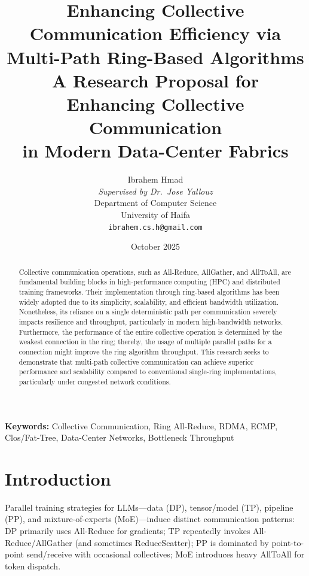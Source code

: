 \documentclass[12pt]{article}
\title{\textbf{Enhancing Collective Communication Efficiency via Multi-Path Ring-Based Algorithms}\\[0.5em]
       \large A Research Proposal for Enhancing Collective Communication\\
       in Modern Data-Center Fabrics}
\author{Ibrahem Hmad\\[0.5em]
        \textit{Supervised by Dr.\ Jose Yallouz}\\[0.3em]
        Department of Computer Science\\
        University of Haifa\\[0.5em]
        \texttt{ibrahem.cs.h@gmail.com}}
\date{October 2025}
\begin{document}
\maketitle
\thispagestyle{empty}

\begin{abstract}
\noindent Collective communication operations, such as All-Reduce, AllGather, and AllToAll, are fundamental building blocks in high-performance computing (HPC) and distributed training frameworks. Their implementation through ring-based algorithms has been widely adopted due to its simplicity, scalability, and efficient bandwidth utilization. Nonetheless, its reliance on a single deterministic path per communication severely impacts resilience and throughput, particularly in modern high-bandwidth networks. Furthermore, the performance of the entire collective operation is determined by the weakest connection in the ring; thereby, the usage of multiple parallel paths for a connection might improve the ring algorithm throughput.
This research seeks to demonstrate that multi-path collective communication can achieve superior performance and scalability compared to conventional single-ring implementations, particularly under congested network conditions.

\end{abstract}

\vspace{1em}
\noindent\textbf{Keywords:} Collective Communication, Ring All-Reduce, RDMA, ECMP, Clos/Fat-Tree, Data-Center Networks, Bottleneck Throughput



 

\newpage

\section{Introduction}
Parallel training strategies for LLMs—data (DP), tensor/model (TP), pipeline (PP), and mixture-of-experts (MoE)—induce distinct communication patterns: DP primarily uses All-Reduce for gradients; TP repeatedly invokes All-Reduce/AllGather (and sometimes ReduceScatter); PP is dominated by point-to-point send/receive with occasional collectives; MoE introduces heavy AllToAll for token dispatch.
\end{document}
